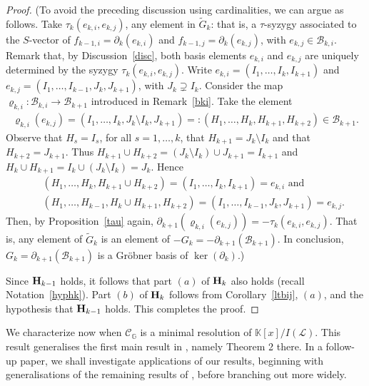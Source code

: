 \documentclass[10pt]{amsart}
\newcommand{\mbk}{\mbox{$\mathbb{K}$}}
\newcommand{\mcb}{\mbox{$\mathcal{B}$}}
\newcommand{\mcc}{\mbox{$\mathcal{C}$}}
\newcommand{\mcl}{\mbox{$\mathcal{L}$}}
\newcommand{\mbfh}{\mbox{${\bf H}$}}
\newcommand{\dif}{\mbox{$\partial$}}
\theoremstyle{definition}
\theoremstyle{remark}
\begin{document}
\begin{proof}
(To avoid the preceding discussion using cardinalities, we can argue
as follows. Take $\tau_{k}(e_{k,i},e_{k,j})$, any element in
$\tilde{G}_k$: that is, a $\tau$-syzygy associated to the $S$-vector
of $f_{k-1,i}=\dif_k(e_{k,i})$ and $f_{k-1,j}=\dif_{k}(e_{k,j})$, with
$e_{k,j}\in\mcb_{k,i}$. Remark that, by Discussion~\ref{disc}, both
basis elements $e_{k,i}$ and $e_{k,j}$ are uniquely determined by the
syzygy $\tau_k(e_{k,i},e_{k,j})$. Write $e_{k,i}=(I_1,\ldots
,I_{k},I_{k+1})$ and $e_{k,j}=(I_1,\ldots ,I_{k-1},J_{k},J_{k+1})$,
with $J_{k}\supsetneq I_{k}$. Consider the map
$\varrho_{k,i}:\mcb_{k,i}\to \mcb_{k+1}$ introduced in
Remark~\ref{bki}. Take the element
\begin{eqnarray*}
\varrho_{k,i}(e_{k,j})=(I_1,\ldots,I_{k},J_{k}\setminus
I_{k},J_{k+1})=:(H_1,\ldots,H_k,H_{k+1},H_{k+2})\in\mcb_{k+1}.
\end{eqnarray*}
Observe that $H_s=I_s$, for all $s=1,\ldots ,k$, that
$H_{k+1}=J_{k}\setminus I_{k}$ and that $H_{k+2}=J_{k+1}$. Thus
$H_{k+1}\cup H_{k+2}=(J_{k}\setminus I_{k})\cup J_{k+1}=I_{k+1}$ and
$H_{k}\cup H_{k+1}=I_{k}\cup (J_{k}\setminus I_{k})=J_{k}$. Hence
\begin{eqnarray*}
&& (H_1,\ldots ,H_{k},H_{k+1}\cup H_{k+2})=(I_1,\ldots
  ,I_{k},I_{k+1})=e_{k,i}\mbox{ and }\\ && (H_1,\ldots
  ,H_{k-1},H_{k}\cup H_{k+1},H_{k+2})=(I_1,\ldots
  ,I_{k-1},J_{k},J_{k+1})=e_{k,j}.
\end{eqnarray*}
Then, by Proposition~\ref{tau} again,
$\dif_{k+1}(\varrho_{k,i}(e_{k,j}))=-\tau_{k}(e_{k,i},e_{k,j})$. That
is, any element of $\tilde{G}_k$ is an element of
$-G_{k}=-\dif_{k+1}(\mcb_{k+1})$. In conclusion,
$G_{k}=\dif_{k+1}(\mcb_{k+1})$ is a Gr\"obner basis of
$\ker(\dif_{k})$.)

Since $\mbfh_{k-1}$ holds, it follows that part $(a)$ of
$\mbfh_k$ also holds (recall Notation~\ref{hyphk}). Part $(b)$ of
$\mbfh_k$ follows from Corollary~\ref{ltbij}, $(a)$, and the
hypothesis that $\mbfh_{k-1}$ holds. This completes the proof.
\end{proof}

We characterize now when $\mcc_{\mathbb{G}}$ is a minimal resolution
of $\mbk[x]/I(\mcl)$. This result generalises the first main result in
\cite{ms}, namely Theorem 2 there. In a follow-up paper, we shall
investigate applications of our results, beginning with
generalisations of the remaining results of \cite{ms}, before
branching out more widely.
\end{document}
